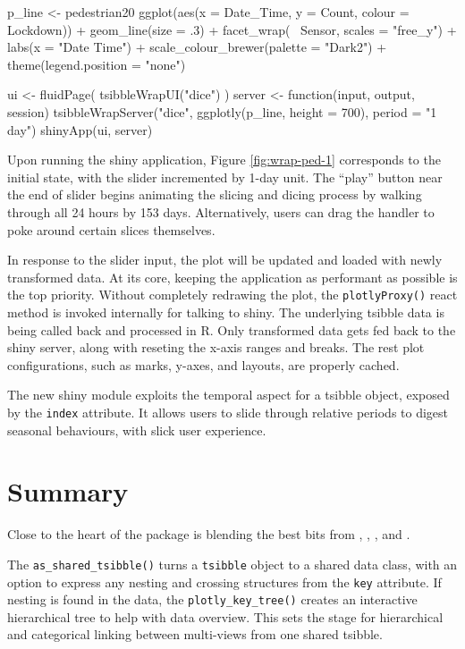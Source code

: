 \begin{Schunk}
\begin{Sinput}
p_line <- pedestrian20 %
  ggplot(aes(x = Date_Time, y = Count, colour = Lockdown)) +
  geom_line(size = .3) +
  facet_wrap(~ Sensor, scales = "free_y") +
  labs(x = "Date Time") +
  scale_colour_brewer(palette = "Dark2") +
  theme(legend.position = "none")

ui <- fluidPage(
  tsibbleWrapUI("dice")
)
server <- function(input, output, session) {
  tsibbleWrapServer("dice", ggplotly(p_line, height = 700), period = "1 day")
}
shinyApp(ui, server)
\end{Sinput}
\end{Schunk}

Upon running the shiny application, Figure \ref{fig:wrap-ped-1}
corresponds to the initial state, with the slider incremented by 1-day
unit. The ``play'' button near the end of slider begins animating the
slicing and dicing process by walking through all 24 hours by 153 days.
Alternatively, users can drag the handler to poke around certain slices
themselves.

In response to the slider input, the plot will be updated and loaded
with newly transformed data. At its core, keeping the application as
performant as possible is the top priority. Without completely redrawing
the plot, the \texttt{plotlyProxy()} react method is invoked internally
for talking to shiny. The underlying tsibble data is being called back
and processed in R. Only transformed data gets fed back to the shiny
server, along with reseting the x-axis ranges and breaks. The rest plot
configurations, such as marks, y-axes, and layouts, are properly cached.

The new shiny module exploits the temporal aspect for a tsibble object,
exposed by the \texttt{index} attribute. It allows users to slide
through relative periods to digest seasonal behaviours, with slick user
experience.

\hypertarget{summary}{%
\section{Summary}\label{summary}}

Close to the heart of the  package is blending the
best bits from , , ,
and .

The \texttt{as\_shared\_tsibble()} turns a \texttt{tsibble} object to a
shared data class, with an option to express any nesting and crossing
structures from the \texttt{key} attribute. If nesting is found in the
data, the \texttt{plotly\_key\_tree()} creates an interactive
hierarchical tree to help with data overview. This sets the stage for
hierarchical and categorical linking between multi-views from one shared
tsibble.


